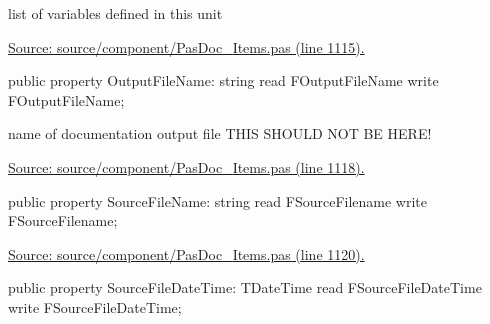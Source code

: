 \documentclass{report}
\newif\ifpdf
\begin{document}
\begin{list}{}
\begin{flushleft}
\ifpdf
\end{flushleft}
\fi


\par list of variables defined in this unit\par
\href{https://github.com/pasdoc/pasdoc/blob/master/source/component/PasDoc_Items.pas#L1115}{Source: source/component/PasDoc{\_}Items.pas (line 1115).}\label{PasDoc_Items.TPasUnit-OutputFileName}
\item[\textbf{OutputFileName}\hfill]
\ifpdf
\begin{flushleft}
\fi
\begin{ttfamily}
public property OutputFileName: string read FOutputFileName write FOutputFileName;\end{ttfamily}

\ifpdf
\end{flushleft}
\fi


\par name of documentation output file THIS SHOULD NOT BE HERE!\par
\href{https://github.com/pasdoc/pasdoc/blob/master/source/component/PasDoc_Items.pas#L1118}{Source: source/component/PasDoc{\_}Items.pas (line 1118).}\label{PasDoc_Items.TPasUnit-SourceFileName}
\item[\textbf{SourceFileName}\hfill]
\ifpdf
\begin{flushleft}
\fi
\begin{ttfamily}
public property SourceFileName: string read FSourceFilename write FSourceFilename;\end{ttfamily}

\ifpdf
\end{flushleft}
\fi


\par  \par
\href{https://github.com/pasdoc/pasdoc/blob/master/source/component/PasDoc_Items.pas#L1120}{Source: source/component/PasDoc{\_}Items.pas (line 1120).}\label{PasDoc_Items.TPasUnit-SourceFileDateTime}
\item[\textbf{SourceFileDateTime}\hfill]
\ifpdf
\begin{flushleft}
\fi
\begin{ttfamily}
public property SourceFileDateTime: TDateTime
      read FSourceFileDateTime write FSourceFileDateTime;\end{ttfamily}

\ifpdf
\end{flushleft}
\fi



\end{list}
\end{document}
